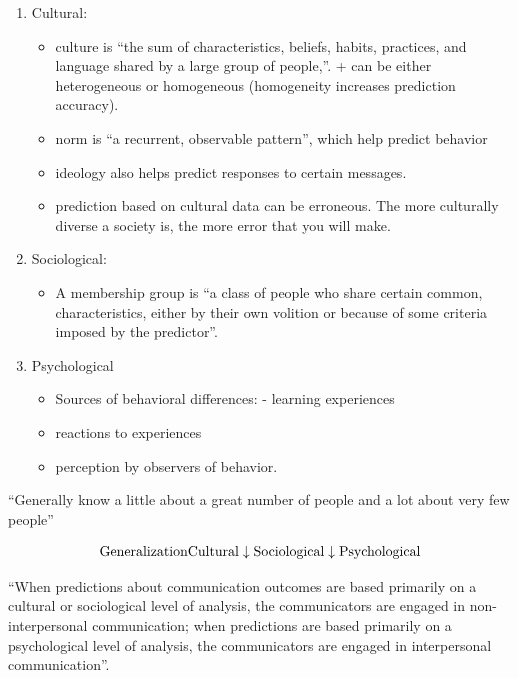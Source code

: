 \documentclass[
]{book}
\providecommand{\tightlist}{%
  \setlength{\itemsep}{0pt}\setlength{\parskip}{0pt}}
\begin{document}
\begin{enumerate}
\def\labelenumi{\arabic{enumi}.}
\item
  Cultural:

  \begin{itemize}
  \tightlist
  \item
    culture is ``the sum of characteristics, beliefs, habits, practices, and language shared by a large group of people,''. + can be either heterogeneous or homogeneous (homogeneity increases prediction accuracy).
  \item
    norm is ``a recurrent, observable pattern'', which help predict behavior
  \item
    ideology also helps predict responses to certain messages.
  \item
    prediction based on cultural data can be erroneous. The more culturally diverse a society is, the more error that you will make.
  \end{itemize}
\item
  Sociological:

  \begin{itemize}
  \tightlist
  \item
    A membership group is ``a class of people who share certain common, characteristics, either by their own volition or because of some criteria imposed by the predictor''.
  \end{itemize}
\item
  Psychological

  \begin{itemize}
  \tightlist
  \item
    Sources of behavioral differences: - learning experiences
  \item
    reactions to experiences
  \item
    perception by observers of behavior.
  \end{itemize}
\end{enumerate}

``Generally know a little about a great number of people and a lot about very few people''

\[
\text{Generalization}  \\
\text{Cultural} \\
\downarrow \\
\text{Sociological} \\
\downarrow \\
\text{Psychological} 
\]

``When predictions about communication outcomes are based primarily on a cultural or sociological level of analysis, the communicators are engaged in non-interpersonal communication; when predictions are based primarily on a psychological level of analysis, the communicators are engaged in interpersonal communication''.
\end{document}
